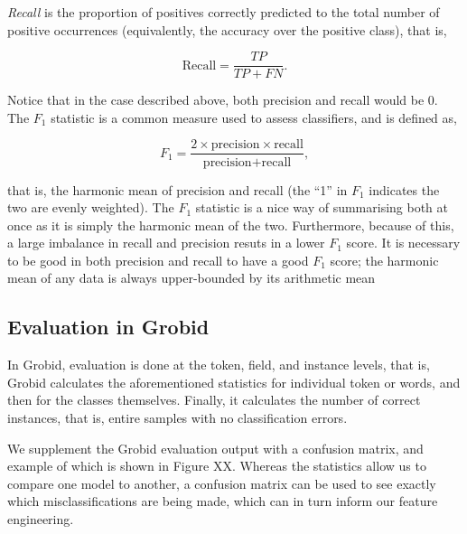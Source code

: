 \emph{Recall} is the proportion of positives correctly predicted to the total number of positive occurrences (equivalently, the accuracy over the positive class), that is,

\begin{equation}
\text{Recall} = \frac{TP}{TP + FN}.
\label{eq:recall}
\end{equation}

Notice that in the case described above, both precision and recall would be 0. The $F_1$ statistic is a common measure used to assess classifiers, and is defined as,

\begin{equation}
F_1 = \frac{2 \times \text{precision} \times \text{recall}}{\text{precision} + \text{recall}},
\label{eq:f1}
\end{equation}

that is, the harmonic mean of precision and recall (the ``1'' in $F_1$ indicates the two are evenly weighted). The $F_1$ statistic is a nice way of summarising both at once as it is simply the harmonic mean of the two. Furthermore, because of this, a large imbalance in recall and precision resuts in a lower $F_1$ score. It is necessary to be good in both precision and recall to have a good $F_1$ score; the harmonic mean of any data is always upper-bounded by its arithmetic mean

\subsection{Evaluation in Grobid}

In Grobid, evaluation is done at the token, field, and instance levels, that is, Grobid calculates the aforementioned statistics for individual token or words, and then for the classes themselves. Finally, it calculates the number of correct instances, that is, entire samples with no classification errors.

We supplement the Grobid evaluation output with a confusion matrix, and example of which is shown in Figure XX. Whereas the statistics allow us to compare one model to another, a confusion matrix can be used to see exactly which misclassifications are being made, which can in turn inform our feature engineering.

